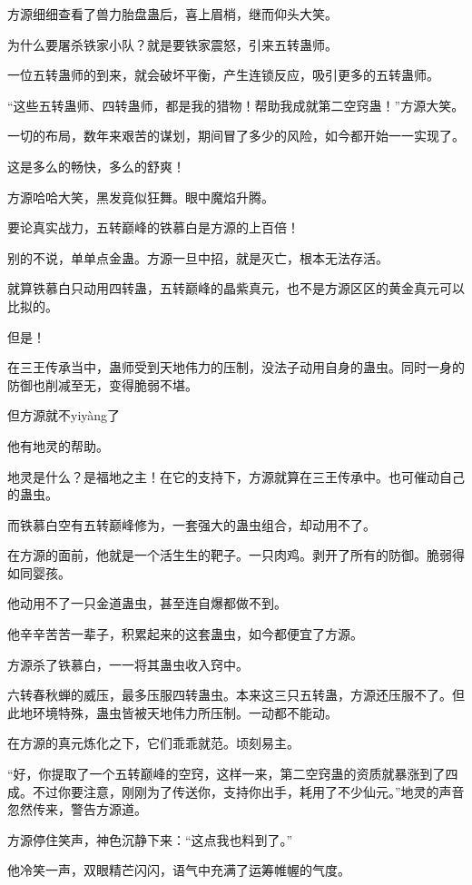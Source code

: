 \begin{this_body}
方源细细查看了兽力胎盘蛊后，喜上眉梢，继而仰头大笑。

为什么要屠杀铁家小队？就是要铁家震怒，引来五转蛊师。

一位五转蛊师的到来，就会破坏平衡，产生连锁反应，吸引更多的五转蛊师。

“这些五转蛊师、四转蛊师，都是我的猎物！帮助我成就第二空窍蛊！”方源大笑。

一切的布局，数年来艰苦的谋划，期间冒了多少的风险，如今都开始一一实现了。

这是多么的畅快，多么的舒爽！

方源哈哈大笑，黑发竟似狂舞。眼中魔焰升腾。

要论真实战力，五转巅峰的铁慕白是方源的上百倍！

别的不说，单单点金蛊。方源一旦中招，就是灭亡，根本无法存活。

就算铁慕白只动用四转蛊，五转巅峰的晶紫真元，也不是方源区区的黄金真元可以比拟的。

但是！

在三王传承当中，蛊师受到天地伟力的压制，没法子动用自身的蛊虫。同时一身的防御也削减至无，变得脆弱不堪。

但方源就不yiyàng了

他有地灵的帮助。

地灵是什么？是福地之主！在它的支持下，方源就算在三王传承中。也可催动自己的蛊虫。

而铁慕白空有五转巅峰修为，一套强大的蛊虫组合，却动用不了。

在方源的面前，他就是一个活生生的靶子。一只肉鸡。剥开了所有的防御。脆弱得如同婴孩。

他动用不了一只金道蛊虫，甚至连自爆都做不到。

他辛辛苦苦一辈子，积累起来的这套蛊虫，如今都便宜了方源。

方源杀了铁慕白，一一将其蛊虫收入窍中。

六转春秋蝉的威压，最多压服四转蛊虫。本来这三只五转蛊，方源还压服不了。但此地环境特殊，蛊虫皆被天地伟力所压制。一动都不能动。

在方源的真元炼化之下，它们乖乖就范。顷刻易主。

“好，你提取了一个五转巅峰的空窍，这样一来，第二空窍蛊的资质就暴涨到了四成。不过你要注意，刚刚为了传送你，支持你出手，耗用了不少仙元。”地灵的声音忽然传来，警告方源道。

方源停住笑声，神色沉静下来：“这点我也料到了。”

他冷笑一声，双眼精芒闪闪，语气中充满了运筹帷幄的气度。


\end{this_body}
